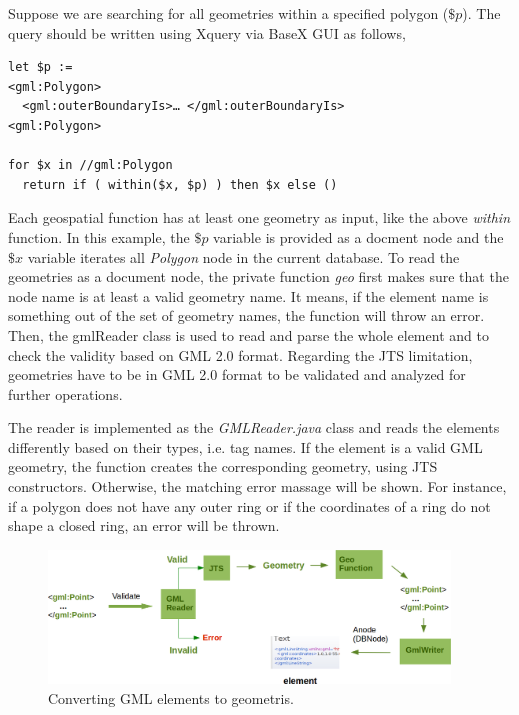 \documentclass[a4paper,12pt]{article}
\begin{document}
Suppose we are searching for all geometries within a specified polygon ($\$p$). The query should be written using Xquery via BaseX GUI as follows,

\begin{verbatim}
let $p := 
<gml:Polygon>
  <gml:outerBoundaryIs>… </gml:outerBoundaryIs>
<gml:Polygon>
	
for $x in //gml:Polygon
  return if ( within($x, $p) ) then $x else ()
\end{verbatim}

Each geospatial function has at least one geometry as input, like the above \textit{within} function. In this example, the $\$p$ variable is provided as a docment node and the $\$x$ variable iterates all \textit{Polygon} node in the current database. To read the geometries as a document node, the private function \textit{geo} first makes sure that the node name is at least a valid geometry name. It means, if the element name is something out of the set of geometry names, the function will throw an error. 
Then, the gmlReader class is used to read and parse the whole element and to check the validity based on GML 2.0 format. Regarding the JTS limitation, geometries have to be in GML 2.0 format to be validated and analyzed for further operations. 


The reader is implemented as the \textit{GMLReader.java} class and reads the elements differently based on their types, i.e. tag names. If the element is a valid GML geometry, the function creates the corresponding geometry, using JTS constructors. Otherwise, the matching error massage will be shown. For instance, if a polygon does not have any outer ring or if the coordinates of a ring do not shape a closed ring, an error will be thrown. 

 \begin{figure}
\centering
\includegraphics[width=0.95\textwidth]{GeoModuleProcess}
\caption{Converting GML elements to geometris.}
\label{figGeoModuleProcess}
\end{figure}
\end{document}
